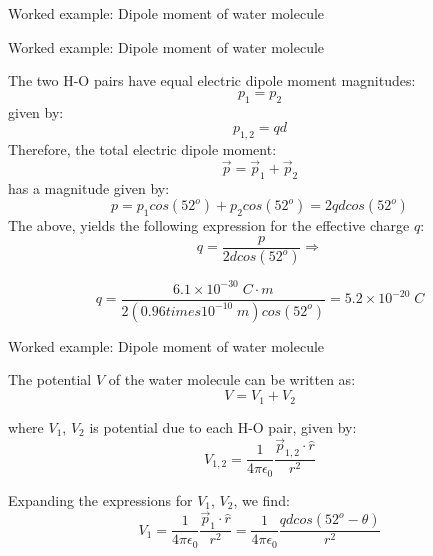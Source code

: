 {\begin{frame}{Worked example: Dipole moment of water molecule}
\end{frame}

%
%
%

\begin{frame}{Worked example: Dipole moment of water molecule}

  The two H-O pairs have equal electric dipole moment magnitudes:
  \begin{equation*}
    p_1 = p_2
  \end{equation*}
  given by:
  \begin{equation*}
    p_{1,2} = q d
  \end{equation*}
  Therefore, the total electric dipole moment:
  \begin{equation*}
    \vec{p} = \vec{p}_1 + \vec{p}_2
  \end{equation*}
  has a magnitude given by:
  \begin{equation*}
    p = p_1 cos(52^o) + p_2 cos(52^o) = 2 q d cos(52^o)
  \end{equation*}
  The above, yields the following expression for the effective charge $q$:
  \begin{equation*}
    q = \frac{p}{2 d cos(52^o)} \Rightarrow
  \end{equation*}

  \begin{equation*}
    q = \frac{6.1 \times 10^{-30} \; C \cdot m}{2 (0.96 times 10^{-10} \; m) cos(52^o)}
      = 5.2 \times 10^{-20} \; C
  \end{equation*}

\end{frame}

%
%
%

\begin{frame}{Worked example: Dipole moment of water molecule}

The potential $V$ of the water molecule can be written as:
  \begin{equation*}
    V = V_1 + V_2
  \end{equation*}

where $V_1$, $V_2$ is potential due to each H-O pair, given by:
  \begin{equation*}
    V_{1,2} = \frac{1}{4\pi \epsilon_0} \frac{\vec{p}_{1,2} \cdot \hat{r}}{r^2}
  \end{equation*}

Expanding the expressions for $V_1$, $V_2$, we find:
  \begin{equation*}
    V_1 = \frac{1}{4\pi \epsilon_0} \frac{\vec{p}_1 \cdot \hat{r}}{r^2}
        = \frac{1}{4\pi \epsilon_0} \frac{qd cos(52^o - \theta)}{r^2}
  \end{equation*}


\end{frame}}
